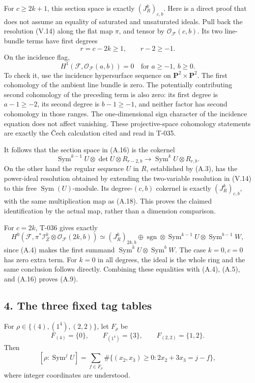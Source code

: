 \documentclass[
  10pt,
]{article}
\begin{document}
For \(c\ge2k+1\), this section space is exactly \((J_R^k)_{c,b}\). Here
is a direct proof that does not assume an equality of saturated and
unsaturated ideals. Pull back the resolution (V.14) along the flat map
\(\pi\), and tensor by \(\mathcal O_{\mathcal F}(c,b)\). Its two
line-bundle terms have first degrees \[
r=c-2k\ge1,\qquad r-2\ge-1.
\] On the incidence flag, \[
H^1(\mathcal F,\mathcal O_{\mathcal F}(a,b))=0
\quad\text{for }a\ge-1,\ b\ge0.
\tag{A.17}
\] To check it, use the incidence hypersurface sequence on
\(\mathbf P^2\times\mathbf P^2\). The first cohomology of the ambient
line bundle is zero. The potentially contributing second cohomology of
the preceding term is also zero: its first degree is \(a-1\ge-2\), its
second degree is \(b-1\ge-1\), and neither factor has second cohomology
in those ranges. The one-dimensional sign character of the incidence
equation does not affect vanishing. These projective-space cohomology
statements are exactly the Čech calculation cited and read in T-035.

It follows that the section space in (A.16) is the cokernel \[
\operatorname{Sym}^{k-1}U\otimes\det U\otimes R_{r-2,b}
\longrightarrow
\operatorname{Sym}^{k}U\otimes R_{r,b}.
\tag{A.18}
\] On the other hand the regular sequence \(U\) in \(R\), established by
(A.3), has the power-ideal resolution obtained by extending the
two-variable resolution in (V.14) to this free
\(\operatorname{Sym}(U)\)-module. Its degree-\((c,b)\) cokernel is
exactly \((J_R^k)_{c,b}\), with the same multiplication map as (A.18).
This proves the claimed identification by the actual map, rather than a
dimension comparison.

For \(c=2k\), T-036 gives exactly \[
H^0(\mathcal F,\pi^*\mathcal I_Z^k\otimes\mathcal O_{\mathcal F}(2k,b))
\simeq
(J_R^k)_{2k,b}\oplus
\operatorname{sgn}\otimes\operatorname{Sym}^{k-1}U
\otimes\operatorname{Sym}^{b-1}W,
\] since (A.4) makes the first summand
\(\operatorname{Sym}^kU\otimes\operatorname{Sym}^bW\). The case
\(k=0,c=0\) has zero extra term. For \(k=0\) in all degrees, the ideal
is the whole ring and the same conclusion follows directly. Combining
these equalities with (A.4), (A.5), and (A.16) proves (A.9).

\subsection{4. The three fixed tag
tables}\label{the-three-fixed-tag-tables}

For \(\rho\in\{(4),(1^4),(2,2)\}\), let \(F_\rho\) be \[
F_{(4)}=\{0\},\qquad F_{(1^4)}=\{3\},\qquad F_{(2,2)}=\{1,2\}.
\tag{A.19}
\] Then \[
[\rho:\operatorname{Sym}^jU]
=\sum_{f\in F_\rho}
\#\{(x_2,x_3)\ge0:2x_2+3x_3=j-f\},
\tag{A.20}
\] where integer coordinates are understood.
\end{document}
